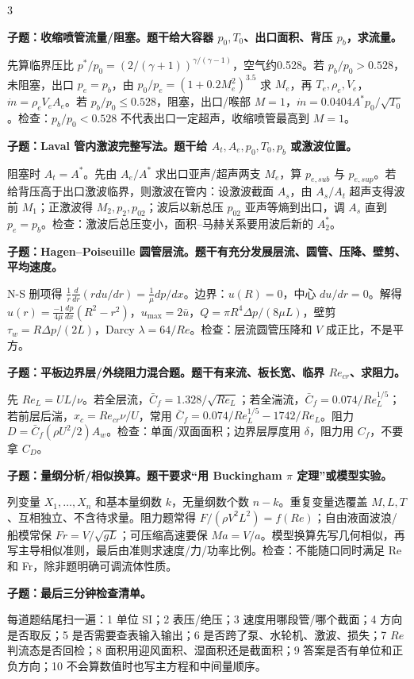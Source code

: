 \documentclass[a4paper]{article}
\newcommand{\qt}[1]{\vspace{0.10pt}\colorbox{Q}{\parbox{\dimexpr\linewidth-2\fboxsep}{\color{white}\bfseries #1}}\par}
\newcommand{\ans}[1]{\colorbox{G}{\parbox{\dimexpr\linewidth-2\fboxsep}{#1}}\par}
\begin{document}
\begin{multicols}{3}
\qt{子题：收缩喷管流量/阻塞。题干给大容器 $p_0,T_0$、出口面积、背压 $p_b$，求流量。}
\ans{先算临界压比 $p^*/p_0=(2/(\gamma+1))^{\gamma/(\gamma-1)}$，空气约0.528。若 $p_b/p_0>0.528$，未阻塞，出口 $p_e=p_b$，由 $p_0/p_e=(1+0.2M_e^2)^{3.5}$ 求 $M_e$，再 $T_e,\rho_e,V_e$，$\dot m=\rho_eV_eA_e$。若 $p_b/p_0\le0.528$，阻塞，出口/喉部 $M=1$，$\dot m=0.0404A^*p_0/\sqrt{T_0}$。检查：$p_b/p_0<0.528$ 不代表出口一定超声，收缩喷管最高到 $M=1$。}
\qt{子题：Laval 管内激波完整写法。题干给 $A_t,A_e,p_0,T_0,p_b$ 或激波位置。}
\ans{阻塞时 $A_t=A^*$。先由 $A_e/A^*$ 求出口亚声/超声两支 $M_e$，算 $p_{e,sub}$ 与 $p_{e,sup}$。若给背压高于出口激波临界，则激波在管内：设激波截面 $A_s$，由 $A_s/A_t$ 超声支得波前 $M_1$；正激波得 $M_2,p_2,p_{02}$；波后以新总压 $p_{02}$ 亚声等熵到出口，调 $A_s$ 直到 $p_e=p_b$。检查：激波后总压变小，面积--马赫关系要用波后新的 $A_2^*$。}
\qt{子题：Hagen--Poiseuille 圆管层流。题干有充分发展层流、圆管、压降、壁剪、平均速度。}
\ans{N-S 删项得 $\frac1r\frac d{dr}(rdu/dr)=\frac1\mu dp/dx$。边界：$u(R)=0$，中心 $du/dr=0$。解得 $u(r)=\frac{-1}{4\mu}\frac{dp}{dx}(R^2-r^2)$，$u_{\max}=2\bar u$，$Q=\pi R^4\Delta p/(8\mu L)$，壁剪 $\tau_w=R\Delta p/(2L)$，Darcy $\lambda=64/Re$。检查：层流圆管压降和 $V$ 成正比，不是平方。}
\qt{子题：平板边界层/外绕阻力混合题。题干有来流、板长宽、临界 $Re_{cr}$、求阻力。}
\ans{先 $Re_L=UL/\nu$。若全层流，$\bar C_f=1.328/\sqrt{Re_L}$；若全湍流，$\bar C_f=0.074/Re_L^{1/5}$；若前层后湍，$x_c=Re_{cr}\nu/U$，常用 $\bar C_f=0.074/Re_L^{1/5}-1742/Re_L$。阻力 $D=\bar C_f(\rho U^2/2)A_w$。检查：单面/双面面积；边界层厚度用 $\delta$，阻力用 $C_f$，不要拿 $C_D$。}
\qt{子题：量纲分析/相似换算。题干要求“用 Buckingham $\pi$ 定理”或模型实验。}
\ans{列变量 $X_1,\dots,X_n$ 和基本量纲数 $k$，无量纲数个数 $n-k$。重复变量选覆盖 $M,L,T$、互相独立、不含待求量。阻力题常得 $F/(\rho V^2L^2)=f(Re)$；自由液面波浪/船模常保 $Fr=V/\sqrt{gL}$；可压缩高速要保 $Ma=V/a$。模型换算先写几何相似，再写主导相似准则，最后由准则求速度/力/功率比例。检查：不能随口同时满足 Re 和 Fr，除非题明确可调流体性质。}
\qt{子题：最后三分钟检查清单。}
\ans{每道题结尾扫一遍：1 单位 SI；2 表压/绝压；3 速度用哪段管/哪个截面；4 方向是否取反；5 是否需要查表输入输出；6 是否跨了泵、水轮机、激波、损失；7 $Re$ 判流态是否回检；8 面积用迎风面积、湿面积还是截面积；9 答案是否有单位和正负方向；10 不会算数值时也写主方程和中间量顺序。}


\end{multicols}
\end{document}
